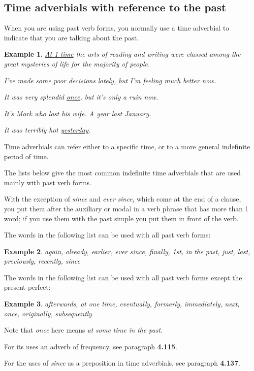 \documentclass[oneside]{book}
\numberwithin{equation}{section}
\newtheorem{example}{Example}[section]
\begin{document}
\subsection{Time adverbials with reference to the past}
\noindent{} When you are using past verb forms, you normally use a time adverbial to indicate that you are talking about the past.
\begin{example}
    \underline{At 1 time} the arts of reading and writing were classed among the great mysteries of life for the majority of people.
    
    I've made some poor decisions \underline{lately}, but I'm feeling much better now.
    
    It was very splendid \underline{once}, but it's only a ruin now.
    
    It's Mark who lost his wife. \underline{A year last January}.
    
    It was terribly hot \underline{yesterday}.
\end{example}
%
\noindent{} Time adverbials can refer either to a specific time, or to a more general indefinite period of time.

%
The lists below give the most common indefinite time adverbials that are used mainly with past verb forms.

With the exception of \textit{since} and \textit{ever since}, which come at the end of a clause, you put them after the auxiliary or modal in a verb phrase that has more than 1 word; if you use them with the past simple you put them in front of the verb.

%
The words in the following list can be used with all past verb forms:
\begin{example}
    again, already, earlier, ever since, finally, 1st, in the past, just, last, previously, recently, since
\end{example}
The words in the following list can be used with all past verb forms except the present perfect:
\begin{example}
    afterwards, at one time, eventually, formerly, immediately, next, once, originally, subsequently
\end{example}
Note that \textit{once} here means \textit{at some time in the past}.

For its uses an adverb of frequency, see paragraph \textbf{4.115}.

%
For the uses of \textit{since} as a preposition in time adverbials, see paragraph \textbf{4.137}.
\end{document}
